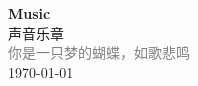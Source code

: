 \vspace*{\fill}
\begin{center}
    \textcolor{green!50}{\Huge\textbf{Music}} \\[1em]
    \textcolor{green!60!pink}{\Large 声音乐章} \\[2em]
    \textcolor{gray}{\large 你是一只梦的蝴蝶，如歌悲鸣} \\[1em]
    \today
\end{center}
\vspace*{\fill}
\clearpage


\clearpage

\clearpage
